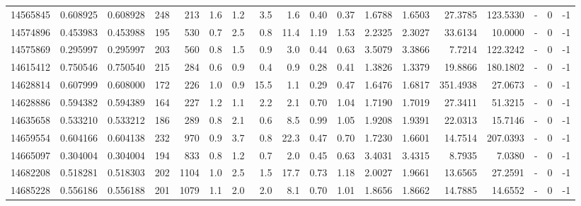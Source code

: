 \begin{tabular}{rrrrrrrrrrrrrrrlrr}
  14565845 & 0.608925 &   0.608928 &  248 &  213 &      1.6 &      1.2 &     3.5 &      1.6 &       0.40 &        0.37 &  1.6788 &  1.6503 &   27.3785 &  123.5330 &             - &        0 &         -1 \\
  14574896 & 0.453983 &   0.453988 &  195 &  530 &      0.7 &      2.5 &     0.8 &     11.4 &       1.19 &        1.53 &  2.2325 &  2.3027 &   33.6134 &   10.0000 &             - &        0 &         -1 \\
  14575869 & 0.295997 &   0.295997 &  203 &  560 &      0.8 &      1.5 &     0.9 &      3.0 &       0.44 &        0.63 &  3.5079 &  3.3866 &    7.7214 &  122.3242 &             - &        0 &         -1 \\
  14615412 & 0.750546 &   0.750540 &  215 &  284 &      0.6 &      0.9 &     0.4 &      0.9 &       0.28 &        0.41 &  1.3826 &  1.3379 &   19.8866 &  180.1802 &             - &        0 &         -1 \\
  14628814 & 0.607999 &   0.608000 &  172 &  226 &      1.0 &      0.9 &    15.5 &      1.1 &       0.29 &        0.47 &  1.6476 &  1.6817 &  351.4938 &   27.0673 &             - &        0 &         -1 \\
  14628886 & 0.594382 &   0.594389 &  164 &  227 &      1.2 &      1.1 &     2.2 &      2.1 &       0.70 &        1.04 &  1.7190 &  1.7019 &   27.3411 &   51.3215 &             - &        0 &         -1 \\
  14635658 & 0.533210 &   0.533212 &  186 &  289 &      0.8 &      2.1 &     0.6 &      8.5 &       0.99 &        1.05 &  1.9208 &  1.9391 &   22.0313 &   15.7146 &             - &        0 &         -1 \\
  14659554 & 0.604166 &   0.604138 &  232 &  970 &      0.9 &      3.7 &     0.8 &     22.3 &       0.47 &        0.70 &  1.7230 &  1.6601 &   14.7514 &  207.0393 &             - &        0 &         -1 \\
  14665097 & 0.304004 &   0.304004 &  194 &  833 &      0.8 &      1.2 &     0.7 &      2.0 &       0.45 &        0.63 &  3.4031 &  3.4315 &    8.7935 &    7.0380 &             - &        0 &         -1 \\
  14682208 & 0.518281 &   0.518303 &  202 & 1104 &      1.0 &      2.5 &     1.5 &     17.7 &       0.73 &        1.18 &  2.0027 &  1.9661 &   13.6565 &   27.2591 &             - &        0 &         -1 \\
  14685228 & 0.556186 &   0.556188 &  201 & 1079 &      1.1 &      2.0 &     2.0 &      8.1 &       0.70 &        1.01 &  1.8656 &  1.8662 &   14.7885 &   14.6552 &             - &        0 &         -1 \\

\end{tabular}
